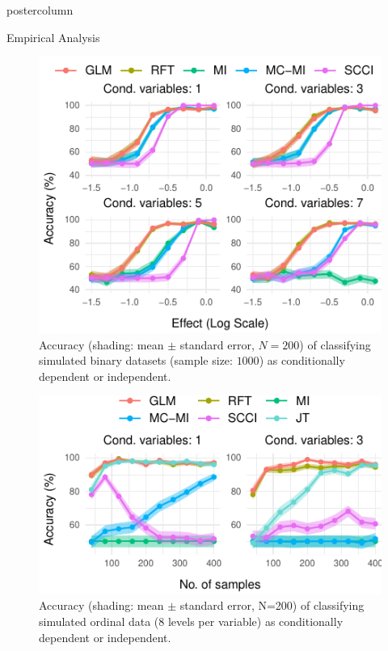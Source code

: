 \documentclass{beamer}
\begin{document}
\begin{frame}
\begin{columns}
\begin{column}{.33\textwidth}
\begin{beamercolorbox}[center]{postercolumn}
\begin{minipage}{.98\textwidth}
{\begin{myblock}{Empirical Analysis}
\begin{figure}
							\includegraphics[scale=2.5]{../in_person/imgs/accuracy.pdf}
							\caption{Accuracy (shading: mean $\pm$ standard error, $N=200$) of classifying
							simulated binary datasets (sample size: $1000$) as conditionally
							dependent or independent.}
							\label{fig:cat_discrimination}
						\end{figure}
						\begin{figure}
							\centering
							\includegraphics[scale=2.5]{../in_person/imgs/accuracy_ordinal.pdf}
							\caption{Accuracy (shading: mean $\pm$ standard error, N=200) of
								classifying simulated ordinal data (8 levels per variable) as
								conditionally dependent or independent.}
							\label{fig:accuracy_ord}
						\end{figure}
					\end{myblock}
		}\end{minipage}\end{beamercolorbox}
	\end{column}

\end{columns}
\end{frame}
\end{document}
